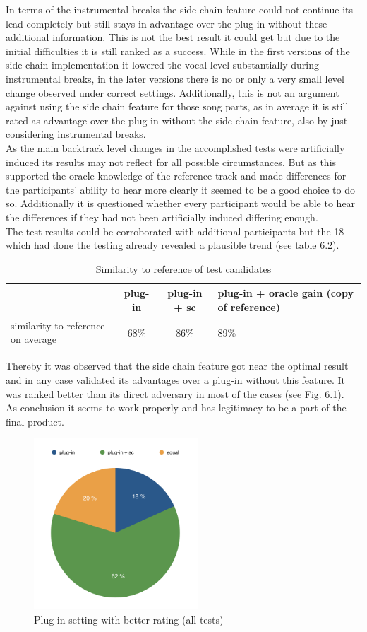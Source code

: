 In terms of the instrumental breaks the side chain feature could not continue its lead completely but still stays in advantage over the plug-in without these additional information. This is not the best result it could get but due to the initial difficulties it is still ranked as a success. While in the first versions of the side chain implementation it lowered the vocal level substantially during instrumental breaks, in the later versions there is no or only a very small level change observed under correct settings. Additionally, this is not an argument against using the side chain feature for those song parts, as in average it is still rated as advantage over the plug-in without the side chain feature, also by just considering instrumental breaks.\\
As the main backtrack level changes in the accomplished tests were artificially induced its results may not reflect for all possible circumstances. But as this supported the oracle knowledge of the reference track and made differences for the participants' ability to hear more clearly it seemed to be a good choice to do so. Additionally it is questioned whether every participant would be able to hear the differences if they had not been artificially induced differing enough.\\
The test results could be corroborated with additional participants but the 18 which had done the testing already revealed a plausible trend (see table 6.2).\\

\begin{table}[H]
\centering
	\begin{tabular}{ p{4cm} | c | c | p{4cm} }
		& plug-in & plug-in + sc & plug-in + oracle gain (copy of reference) \\ \hline
		similarity to reference on average & 68\% & 86\% & 89\% \\
	\end{tabular}
	\caption{Similarity to reference of test candidates}
\end{table}

Thereby it was observed that the side chain feature got near the optimal result and in any case validated its advantages over a plug-in without this feature. It was ranked better than its direct adversary in most of the cases (see Fig. 6.1).\\
As conclusion it seems to work properly and has legitimacy to be a part of the final product.\\

\begin{figure}[H]
\includegraphics[width=0.55\textwidth]{images/betterRating}
\centering
\caption{Plug-in setting with better rating (all tests)}
\end{figure}
